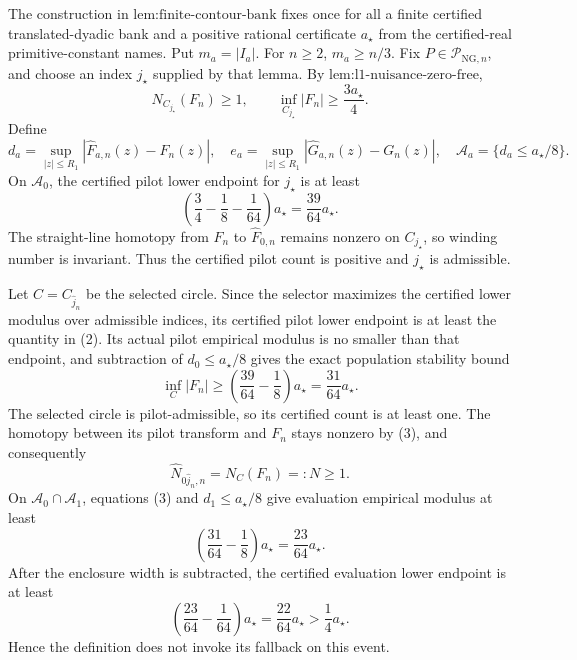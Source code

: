 The construction in \(\text{lem:finite-contour-bank}\) fixes once for all a finite certified translated-dyadic bank and a positive rational certificate \(a_{\star}\) from the certified-real primitive-constant names.  Put \(m_a=|I_a|\).  For \(n\ge2\), \(m_a\ge n/3\).  Fix \(P\in\mathcal P_{\mathrm{NG},n}\), and choose an index \(j_{\star}\) supplied by that lemma.  By \(\text{lem:l1-nuisance-zero-free}\),
\[
 N_{C_{j_{\star}}}(F_n)\ge1,
 \qquad
 \inf_{C_{j_{\star}}}|F_n|
 \ge\frac{3a_{\star}}4. \tag{1}
\]
Define
\[
 d_a=\sup_{|z|\le R_1}|\widehat F_{a,n}(z)-F_n(z)|,
 \quad
 e_a=\sup_{|z|\le R_1}|\widehat G_{a,n}(z)-G_n(z)|,
 \quad
 \mathcal A_a=\{d_a\le a_{\star}/8\}.
\]
On \(\mathcal A_0\), the certified pilot lower endpoint for \(j_{\star}\) is at least
\[
 \left(\frac34-\frac18-\frac1{64}\right)a_{\star}
 =\frac{39}{64}a_{\star}. \tag{2}
\]
The straight-line homotopy from \(F_n\) to \(\widehat F_{0,n}\) remains nonzero on \(C_{j_{\star}}\), so winding number is invariant.  Thus the certified pilot count is positive and \(j_{\star}\) is admissible.

Let \(C=C_{\widehat j_n}\) be the selected circle.  Since the selector maximizes the certified lower modulus over admissible indices, its certified pilot lower endpoint is at least the quantity in (2).  Its actual pilot empirical modulus is no smaller than that endpoint, and subtraction of \(d_0\le a_{\star}/8\) gives the exact population stability bound
\[
 \inf_C|F_n|
 \ge\left(\frac{39}{64}-\frac18\right)a_{\star}
 =\frac{31}{64}a_{\star}. \tag{3}
\]
The selected circle is pilot-admissible, so its certified count is at least one.  The homotopy between its pilot transform and \(F_n\) stays nonzero by (3), and consequently
\[
 \widehat N_{0\widehat j_n,n}=N_C(F_n)=:N\ge1. \tag{4}
\]
On \(\mathcal A_0\cap\mathcal A_1\), equations (3) and \(d_1\le a_{\star}/8\) give evaluation empirical modulus at least
\[
 \left(\frac{31}{64}-\frac18\right)a_{\star}
 =\frac{23}{64}a_{\star}.
\]
After the enclosure width is subtracted, the certified evaluation lower endpoint is at least
\[
 \left(\frac{23}{64}-\frac1{64}\right)a_{\star}
 =\frac{22}{64}a_{\star}>\frac{1}{4}a_{\star}. \tag{5}
\]
Hence the definition does not invoke its fallback on this event.

